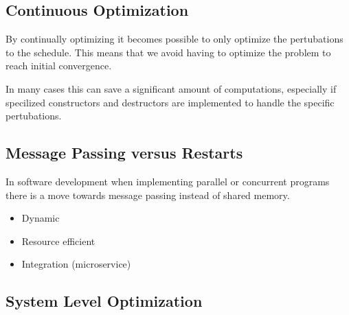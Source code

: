 \documentclass[preprint,12pt,authoryear]{elsarticle}
\begin{document}
\subsection{Continuous Optimization}
By continually optimizing it becomes possible to only optimize the pertubations to the schedule. This means that we avoid having to optimize the problem to reach initial convergence.

In many cases this can save a significant amount of computations, especially if specilized constructors and destructors are implemented to handle the specific pertubations.

\subsection{Message Passing versus Restarts}
In software development when implementing parallel or concurrent programs there is a move towards message passing instead of shared memory.   
\begin{itemize}
	\item Dynamic
	\item Resource efficient
	\item Integration (microservice)  
\end{itemize}

\subsection{System Level Optimization}









\end{document}
